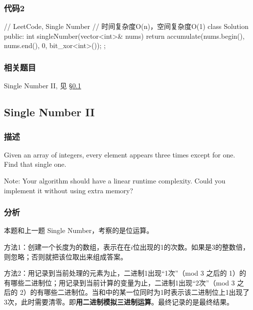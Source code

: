 \subsubsection{代码2}
\begin{Code}
// LeetCode, Single Number
// 时间复杂度O(n)，空间复杂度O(1)
class Solution {
public:
    int singleNumber(vector<int>& nums) {
        return accumulate(nums.begin(), nums.end(), 0, bit_xor<int>());
    }
};
\end{Code}


\subsubsection{相关题目}
\begindot
\item  Single Number II, 见 \S \ref{sec:single-number-ii}
\myenddot


\subsection{Single Number II} %
\label{sec:single-number-ii}


\subsubsection{描述}
Given an array of integers, every element appears three times except for one. Find that single one.

Note:
Your algorithm should have a linear runtime complexity. Could you implement it without using extra memory?


\subsubsection{分析}
本题和上一题 Single Number，考察的是位运算。

方法1：创建一个长度为的数组，表示在在$i$位出现的1的次数。如果是3的整数倍，则忽略；否则就把该位取出来组成答案。

方法2：用记录到当前处理的元素为止，二进制1出现“1次”（mod 3 之后的 1）的有哪些二进制位；用记录到当前计算的变量为止，二进制1出现“2次”（mod 3 之后的 2）的有哪些二进制位。当和中的某一位同时为1时表示该二进制位上1出现了3次，此时需要清零。即\textbf{用二进制模拟三进制运算}。最终记录的是最终结果。

